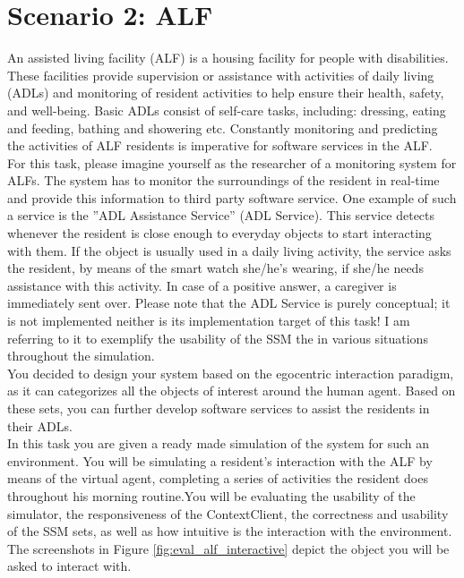 \section{Scenario 2: ALF} %
\label{sec:eval_alf_scenario}
An assisted living facility (ALF) is a housing facility for people with disabilities. These facilities provide supervision or assistance with activities of daily living (ADLs) and monitoring of resident activities to help ensure their health, safety, and well-being. Basic ADLs consist of self-care tasks, including: dressing, eating and feeding, bathing and showering etc. Constantly monitoring and predicting the activities of ALF residents is imperative for software services in the ALF.\\

For this task, please imagine yourself as the researcher of a monitoring system for ALFs. The system has to monitor the surroundings of the resident in real-time and provide this information to third party software service. One example of such a service is the ''ADL Assistance Service'' (ADL Service). This service detects whenever the resident is close enough to everyday objects to start interacting with them. If the object is usually used in a daily living activity, the service asks the resident, by means of the smart watch she/he's wearing, if she/he needs assistance with this activity. In case of a positive answer, a caregiver is immediately sent over. Please note that the ADL Service is purely conceptual; it is not implemented neither is its implementation target of this task! I am referring to it to exemplify the usability of the SSM the in various situations throughout the simulation.\\

You decided to design your system based on the egocentric interaction paradigm, as it can categorizes all the objects of interest around the human agent. Based on these sets, you can further develop software services to assist the residents in their ADLs.\\

In this task you are given a ready made simulation of the system for such an environment. You will be simulating a resident's interaction with the ALF by means of the virtual agent, completing a series of activities the resident does throughout his morning routine.You will be evaluating the usability of the simulator, the responsiveness of the ContextClient, the correctness and usability of the SSM sets, as well as how intuitive is the interaction with the environment. The screenshots in Figure \ref{fig:eval_alf_interactive} depict the object you will be asked to interact with.\\


